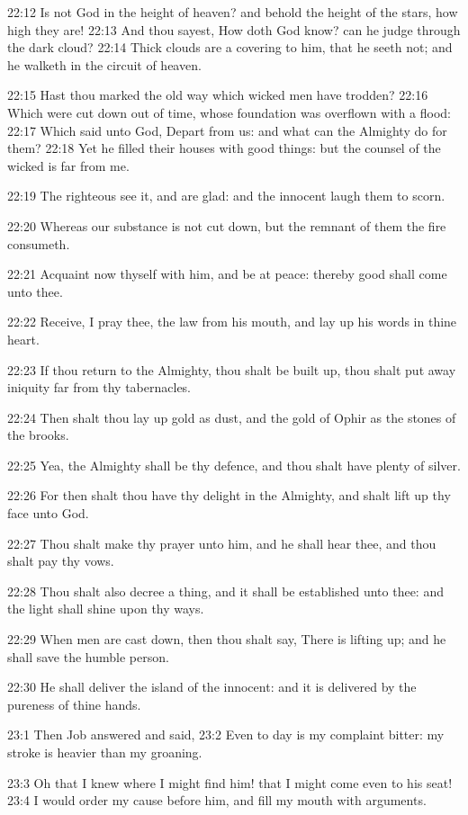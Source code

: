 22:12 Is not God in the height of heaven? and behold the height of the
stars, how high they are!  22:13 And thou sayest, How doth God know?
can he judge through the dark cloud?  22:14 Thick clouds are a
covering to him, that he seeth not; and he walketh in the circuit of
heaven.

22:15 Hast thou marked the old way which wicked men have trodden?
22:16 Which were cut down out of time, whose foundation was overflown
with a flood: 22:17 Which said unto God, Depart from us: and what can
the Almighty do for them?  22:18 Yet he filled their houses with good
things: but the counsel of the wicked is far from me.

22:19 The righteous see it, and are glad: and the innocent laugh them
to scorn.

22:20 Whereas our substance is not cut down, but the remnant of them
the fire consumeth.

22:21 Acquaint now thyself with him, and be at peace: thereby good
shall come unto thee.

22:22 Receive, I pray thee, the law from his mouth, and lay up his
words in thine heart.

22:23 If thou return to the Almighty, thou shalt be built up, thou
shalt put away iniquity far from thy tabernacles.

22:24 Then shalt thou lay up gold as dust, and the gold of Ophir as
the stones of the brooks.

22:25 Yea, the Almighty shall be thy defence, and thou shalt have
plenty of silver.

22:26 For then shalt thou have thy delight in the Almighty, and shalt
lift up thy face unto God.

22:27 Thou shalt make thy prayer unto him, and he shall hear thee, and
thou shalt pay thy vows.

22:28 Thou shalt also decree a thing, and it shall be established unto
thee: and the light shall shine upon thy ways.

22:29 When men are cast down, then thou shalt say, There is lifting
up; and he shall save the humble person.

22:30 He shall deliver the island of the innocent: and it is delivered
by the pureness of thine hands.

23:1 Then Job answered and said, 23:2 Even to day is my complaint
bitter: my stroke is heavier than my groaning.

23:3 Oh that I knew where I might find him! that I might come even to
his seat!  23:4 I would order my cause before him, and fill my mouth
with arguments.


